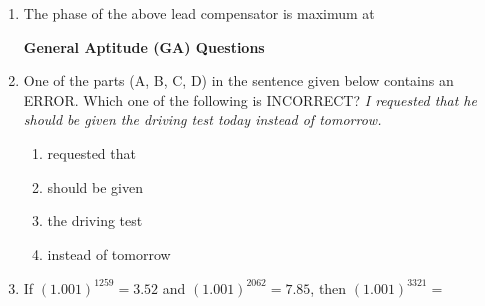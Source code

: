 \documentclass[journal,12pt,onecolumn]{IEEEtran}
\theoremstyle{remark}
\begin{document}
\begin{enumerate}[start=1, label=Q.\arabic*]
\begin{enumerate}
\end{enumerate}
\hfill{}

\item The phase of the above lead compensator is maximum at

\begin{enumerate}
\end{enumerate}
\hfill{}

\vspace{1cm}
\textbf{{General Aptitude (GA) Questions}}\\
\item One of the parts (A, B, C, D) in the sentence given below contains an ERROR. Which one of the following is INCORRECT?
\textit{I requested that he should be given the driving test today instead of tomorrow.}

\begin{enumerate}
    \item requested that
    \item should be given
    \item the driving test
    \item instead of tomorrow
\end{enumerate}
\hfill{}

\item If $(1.001)^{1259} = 3.52$ and $(1.001)^{2062} = 7.85$, then $(1.001)^{3321}=$

\begin{enumerate}
\end{enumerate}
\hfill{}


\end{enumerate}
\end{document}
